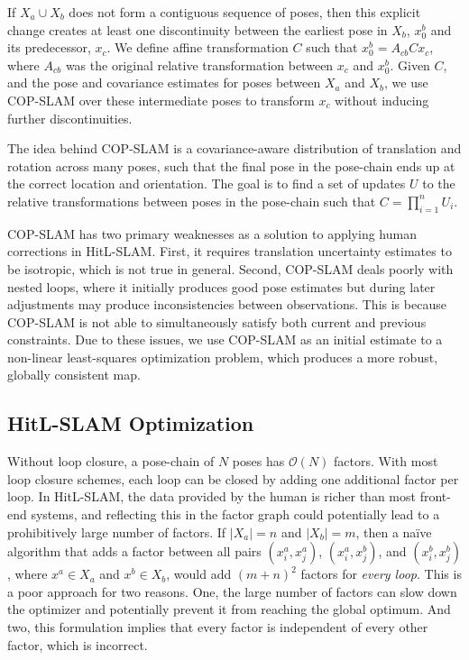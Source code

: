 \documentclass[letterpaper]{article} %
\theoremstyle{definition}
\begin{document}
If $X_a \cup X_b$ does not form a contiguous sequence of poses, then this explicit change creates at least one discontinuity between the earliest pose in $X_b$, $x^b _0$ and its predecessor, $x_c$. We define affine transformation $C$ such that $x^b _0 = A_{cb} C x_c$, where $A_{cb}$ was the original relative transformation between $x_c$ and $x_0 ^b$. Given $C$, and the pose and covariance estimates for poses between $X_a$ and $X_b$, we use COP-SLAM over these intermediate poses to transform $x_c$ without inducing further discontinuities.

The idea behind COP-SLAM is a covariance-aware distribution of translation and
rotation across many poses, such that the final pose in the pose-chain ends up
at the correct location and orientation. The goal is to find a set of updates
$U$ to the relative transformations between poses in the pose-chain such that $C
= \prod_{i=1} ^n U_i$.

COP-SLAM has two primary weaknesses as a solution to applying human
corrections in HitL-SLAM. First, it requires translation uncertainty estimates
to be isotropic, which is not true in general. Second, COP-SLAM deals poorly
with nested loops, where it initially produces good pose estimates but during
later adjustments may produce inconsistencies between observations. This is
because COP-SLAM is not able to simultaneously satisfy both current and
previous constraints. Due to these issues, we use COP-SLAM as an initial
estimate to a non-linear least-squares optimization problem, which produces a
more robust, globally consistent map.

\subsection{HitL-SLAM Optimization}
\label{sec:hitl-optimization}
Without loop closure, a pose-chain of $N$ poses has $\mathcal{O}(N)$ factors.
With most loop closure schemes, each loop can be closed by adding one
additional factor per loop. In HitL-SLAM, the data provided by the human is
richer than most front-end systems, and reflecting this in the factor graph
could potentially lead to a prohibitively large number of factors. If $|X_a| =
n$ and $|X_b| = m$, then a na\"ive algorithm that adds a factor between all
pairs $(x^a _i, x^a_j)$, $(x^a_i, x^b _j)$, and $(x^b_i, x^b_j)$, where $x^a \in
X_a$ and $x^b \in X_b$, would add $(m+n)^2$ factors for \emph{every loop}. This
is a poor approach for two reasons. One, the large number of factors can slow
down the optimizer and potentially prevent it from reaching the global optimum.
And two, this formulation implies that every factor is independent of every
other factor, which is incorrect.
\end{document}
